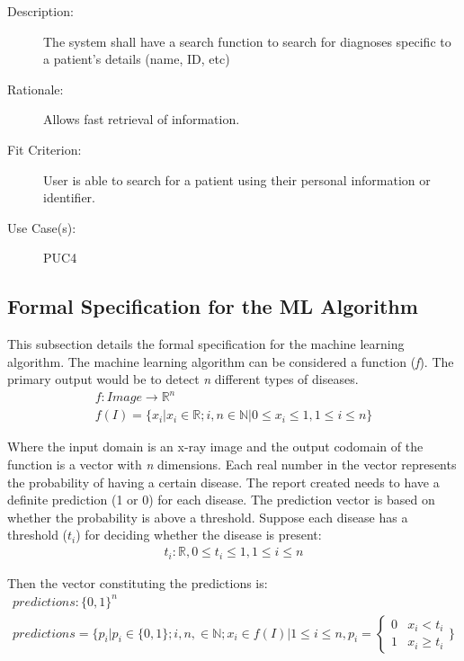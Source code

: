 \documentclass[12pt]{article}
\begin{document}
\begin{enumerate}[label=FR\arabic*., series=frs]
\begin{item}
\begin{description}
            \item[Description:] The system shall have a search function to search for diagnoses specific to a patient's details (name, ID, etc)
            \item[Rationale:] Allows fast retrieval of information.
            \item[Fit Criterion:] User is able to search for a patient using their personal information or identifier.
            \item[Use Case(s):] PUC4
        \end{description}
    \end{item}
\end{enumerate}

\subsection{Formal Specification for the ML Algorithm}
This subsection details the formal specification for the machine learning algorithm.
The machine learning algorithm can be considered a function (\textit{f}).
The primary output would be to detect \textit{n} different types of diseases.
\begin{gather*}
    f:Image \rightarrow \mathbb{R}^n \\
    f(I) = \{x_i | x_i \in \mathbb{R}; i, n \in \mathbb{N} | 0 \le x_i \le 1, 1 \le i \le n\}
\end{gather*}
 
\noindent Where the input domain is an x-ray image and the output codomain of the function is a vector with \textit{n} dimensions.
Each real number in the vector represents the probability of having a certain disease. 
The report created needs to have a definite prediction (1 or 0) for each disease. The prediction vector is based on whether the probability is above a threshold.  
Suppose each disease has a threshold ($t_i$) for deciding whether the disease is present: 
\begin{align*}
    t_i: \mathbb{R}, 0 \le t_i \le 1, 1 \le i \le n
\end{align*}

\noindent Then the vector constituting the predictions is:
\begin{gather*}
    predictions: \{0,1\}^n \\
    predictions = \Biggl\{ p_i \big| p_i \in \{ 0, 1 \}; i, n, \in \mathbb{N}; x_i \in f(I) \big| 1 \le i \le n, p_i =
    \begin{cases}
        0 & x_i < t_i \\
        1 & x_i \ge t_i
    \end{cases}
    \Biggr\}
\end{gather*}
\end{document}
